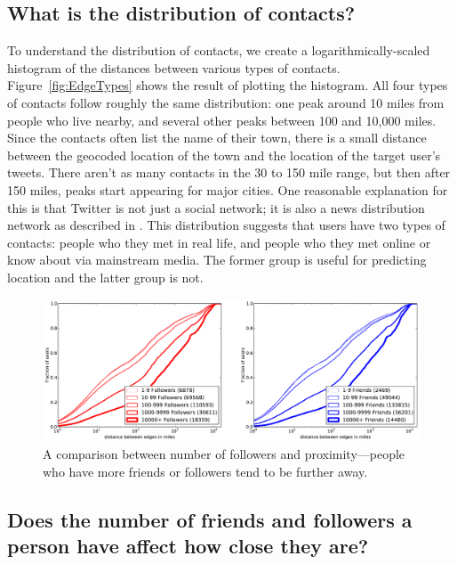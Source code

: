 \documentclass[letterpaper]{article}
\begin{document}
\subsection{What is the distribution of contacts?}

To understand the distribution of contacts, we create a logarithmically-scaled
histogram of the distances between various types of contacts.
%
Figure~\ref{fig:EdgeTypes} shows the result of plotting the histogram.
%
All four types of contacts follow roughly the same
distribution: one peak around 10 miles from people who live nearby, and several
other peaks between 100 and 10,000 miles.
%
Since the contacts often list the name of their town, there is a small distance
between the geocoded location of the town and the location of the target
user's tweets.
%
There aren't as many contacts in the 30 to 150 mile range, but then after 150
miles, peaks start appearing for major cities.
%
One reasonable explanation for this is that Twitter is not just a social
network; it is also a news distribution network as described in
\cite{kwak2010why}.
%
This distribution suggests that users have two types of contacts: people who
they met in real life, and people who they met online or know about via
mainstream media.
%
The former group is useful for predicting location and the latter group is not.
%


\begin{figure}[tbh]
\centering
\includegraphics[width=\linewidth]{figures/edge_counts.pdf}
\caption{
A comparison between number of followers and proximity---people who have more
friends or followers tend to be further away.
}
\label{fig:EdgeCounts}
\end{figure}

\subsection{Does the number of friends and followers a person have affect how
close they are?}
\end{document}
